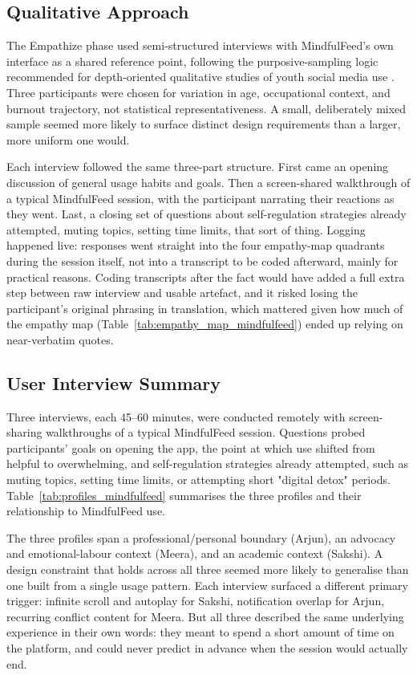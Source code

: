 \documentclass[11pt]{article}
\begin{document}
\subsection{Qualitative Approach}
The Empathize phase used semi-structured interviews with MindfulFeed's own interface as a shared reference point, following the purposive-sampling logic recommended for depth-oriented qualitative studies of youth social media use \parencites[5]{7173856}. Three participants were chosen for variation in age, occupational context, and burnout trajectory, not statistical representativeness. A small, deliberately mixed sample seemed more likely to surface distinct design requirements than a larger, more uniform one would.

Each interview followed the same three-part structure. First came an opening discussion of general usage habits and goals. Then a screen-shared walkthrough of a typical MindfulFeed session, with the participant narrating their reactions as they went. Last, a closing set of questions about self-regulation strategies already attempted, muting topics, setting time limits, that sort of thing. Logging happened live: responses went straight into the four empathy-map quadrants during the session itself, not into a transcript to be coded afterward, mainly for practical reasons. Coding transcripts after the fact would have added a full extra step between raw interview and usable artefact, and it risked losing the participant's original phrasing in translation, which mattered given how much of the empathy map (Table~\ref{tab:empathy_map_mindfulfeed}) ended up relying on near-verbatim quotes.

\subsection{User Interview Summary}
\label{sec:mindfulfeed_interviews}
Three interviews, each 45--60 minutes, were conducted remotely with screen-sharing walkthroughs of a typical MindfulFeed session. Questions probed participants' goals on opening the app, the point at which use shifted from helpful to overwhelming, and self-regulation strategies already attempted, such as muting topics, setting time limits, or attempting short "digital detox" periods. Table~\ref{tab:profiles_mindfulfeed} summarises the three profiles and their relationship to MindfulFeed use.

The three profiles span a professional/personal boundary (Arjun), an advocacy and emotional-labour context (Meera), and an academic context (Sakshi). A design constraint that holds across all three seemed more likely to generalise than one built from a single usage pattern. Each interview surfaced a different primary trigger: infinite scroll and autoplay for Sakshi, notification overlap for Arjun, recurring conflict content for Meera. But all three described the same underlying experience in their own words: they meant to spend a short amount of time on the platform, and could never predict in advance when the session would actually end.
\end{document}
